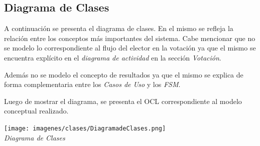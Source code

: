 \documentclass[spanish, 10pt,a4paper]{article}
\numberwithin{equation}{section} %
\begin{document}
\newpage
\subsection{Diagrama de Clases}
	A continuación se presenta el diagrama de clases. En el mismo se refleja la relación entre los conceptos más importantes del sistema. Cabe mencionar que no se modelo lo correspondiente al flujo del elector en la votación ya que el mismo se encuentra explícito en el \textit{diagrama de actividad } en la sección \textit{Votación}. 
\par Además no se modelo el concepto de resultados ya que el mismo se explica de forma complementaria entre los \textit{Casos de Uso} y los \textit{FSM}.
\par Luego de mostrar el diagrama, se presenta el OCL correspondiente al modelo conceptual realizado. 

\vspace{\baselineskip}
    \begin{center}
                \texttt{[image: imagenes/clases/DiagramadeClases.png]}
                \\
                \vspace{1pt}
                \footnotesize\textit{Diagrama de Clases}
        \end{center}
\vspace{\baselineskip}
\end{document}
